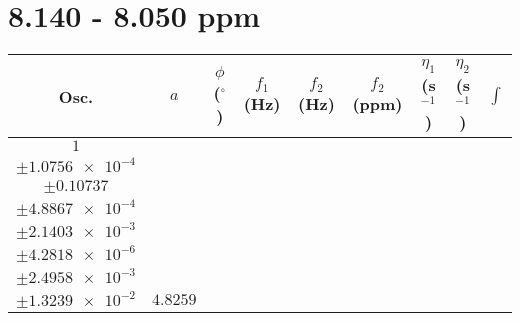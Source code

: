 \documentclass[8pt]{article}
\begin{document}
\section*{8.140 - 8.050 ppm}
\begin{longtable}[l]{c c c c c c c c c}
\toprule
Osc. & $a$ & $\phi$ ($^{\circ}$) & $f_1$ (Hz) & $f_2$ (Hz) & $f_2$ (ppm) & $\eta_1$ (s$^{-1}$) & $\eta_2$ (s$^{-1}$) & $\int$\\
\midrule
$\num{1}$ & \begin{tabular}[c]{@{}c@{}}$\num{6.4472e-2}$ \\ $\pm\num{1.0756e-4}$\end{tabular} & \begin{tabular}[c]{@{}c@{}}$\num{0.28126}$ \\ $\pm\num{0.10737}$\end{tabular} & \begin{tabular}[c]{@{}c@{}}$\num{-4.4435}$ \\ $\pm\num{4.8867e-4}$\end{tabular} & \begin{tabular}[c]{@{}c@{}}$\num{4.0405e+3}$ \\ $\pm\num{2.1403e-3}$\end{tabular} & \begin{tabular}[c]{@{}c@{}}$\num{8.0832}$ \\ $\pm\num{4.2818e-6}$\end{tabular} & \begin{tabular}[c]{@{}c@{}}$\num{1.6626}$ \\ $\pm\num{2.4958e-3}$\end{tabular} & \begin{tabular}[c]{@{}c@{}}$\num{4.3656}$ \\ $\pm\num{1.3239e-2}$\end{tabular} & $\num{4.8259}$\\

\end{longtable}
\end{document}
